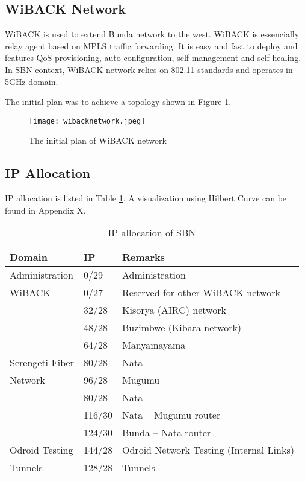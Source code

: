 \subsection{WiBACK Network}
WiBACK is used to extend Bunda network to the west. WiBACK is essencially relay agent based on MPLS traffic forwarding. It is easy and fast to deploy and features QoS-provisioning, auto-configuration, self-management and self-healing. In SBN context, WiBACK network relies on 802.11 standards and operates in 5GHz domain.

The initial plan was to achieve a topology shown in Figure \ref{wibacknetwork}.
\begin{figure}[htbp]
\centering
\texttt{[image: wibacknetwork.jpeg]}
\caption{The initial plan of WiBACK network}
\label{wibacknetwork}
\end{figure}

\subsection{IP Allocation}
IP allocation is listed in Table \ref{ip}. A visualization using Hilbert Curve can be found in Appendix X.
\begin{table}[htbp]
\centering
\begin{tabular}{lll}
 \hline
 Domain & IP & Remarks \\
 \hline
 Administration & 0/29 & Administration \\		
 \hline
 WiBACK & 0/27 & Reserved for other WiBACK network\\
 & 32/28 & Kisorya (AIRC) network \\
 & 48/28 & Buzimbwe (Kibara network) \\
 & 64/28 & Manyamayama \\
 \hline
 Serengeti Fiber & 80/28 & Nata \\
 Network & 96/28 & Mugumu \\
 & 80/28 & Nata \\
 & 116/30 & Nata -- Mugumu router \\
 & 124/30 & Bunda -- Nata router \\
 \hline 
 Odroid Testing & 144/28 & Odroid Network Testing (Internal Links) \\
 \hline 
 Tunnels & 128/28 & Tunnels \\
 \hline
\end{tabular}
\caption{IP allocation of SBN}
\label{ip}
\end{table}